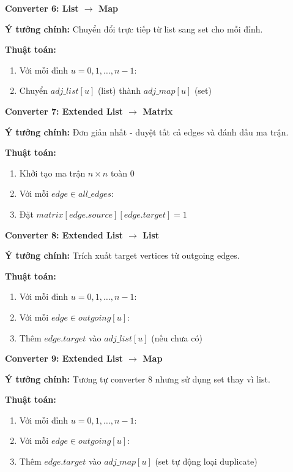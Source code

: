 \documentclass[12pt,a4paper]{article}
\begin{document}
\textbf{Converter 6: List $\rightarrow$ Map}

\textbf{Ý tưởng chính:} Chuyển đổi trực tiếp từ list sang set cho mỗi đỉnh.

\textbf{Thuật toán:}
\begin{enumerate}
    \item Với mỗi đỉnh $u = 0, 1, \ldots, n-1$:
    \item Chuyển $adj\_list[u]$ (list) thành $adj\_map[u]$ (set)
\end{enumerate}
\vspace{0.5cm}

\textbf{Converter 7: Extended List $\rightarrow$ Matrix}

\textbf{Ý tưởng chính:} Đơn giản nhất - duyệt tất cả edges và đánh dấu ma trận.

\textbf{Thuật toán:}
\begin{enumerate}
    \item Khởi tạo ma trận $n \times n$ toàn $0$
    \item Với mỗi $edge \in all\_edges$:
    \item Đặt $matrix[edge.source][edge.target] = 1$
\end{enumerate}
\vspace{0.5cm}

\textbf{Converter 8: Extended List $\rightarrow$ List}

\textbf{Ý tưởng chính:} Trích xuất target vertices từ outgoing edges.

\textbf{Thuật toán:}
\begin{enumerate}
    \item Với mỗi đỉnh $u = 0, 1, \ldots, n-1$:
    \item Với mỗi $edge \in outgoing[u]$:
    \item Thêm $edge.target$ vào $adj\_list[u]$ (nếu chưa có)
\end{enumerate}
\vspace{0.5cm}

\textbf{Converter 9: Extended List $\rightarrow$ Map}

\textbf{Ý tưởng chính:} Tương tự converter 8 nhưng sử dụng set thay vì list.

\textbf{Thuật toán:}
\begin{enumerate}
    \item Với mỗi đỉnh $u = 0, 1, \ldots, n-1$:
    \item Với mỗi $edge \in outgoing[u]$:
    \item Thêm $edge.target$ vào $adj\_map[u]$ (set tự động loại duplicate)
\end{enumerate}
\vspace{0.5cm}
\end{document}
